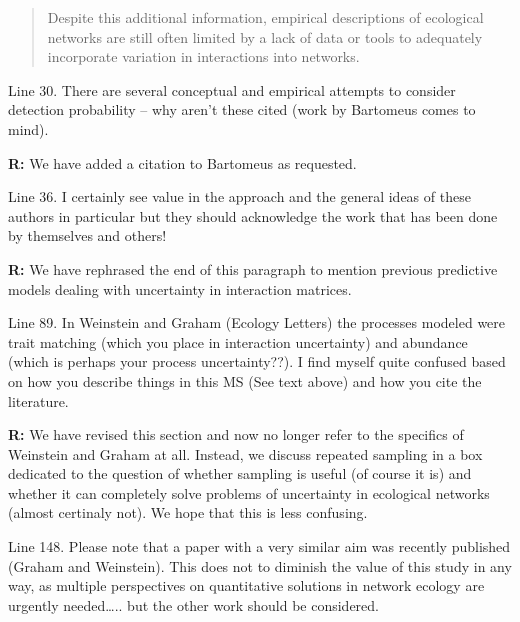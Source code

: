\documentclass[12pt]{letter}
\newenvironment{refquote}{\bigskip \begin{it}}{\end{it}\smallskip}
\begin{document}
			\begin{quotation}
				Despite this additional information, empirical descriptions of ecological networks are still often limited by a lack of data or tools to adequately incorporate variation in interactions into networks.
			\end{quotation}


		\begin{refquote}
		Line 30.  There are several conceptual and empirical attempts to consider detection probability – why aren’t these cited (work by Bartomeus comes to mind).\\
		\end{refquote}

			\textbf{R:} We have added a citation to Bartomeus as requested.

		\begin{refquote}
			Line 36.  I certainly see value in the approach and the general ideas of these authors in particular but they should acknowledge the work that has been done by themselves and others!\\
		\end{refquote}

		\textbf{R:} We have rephrased the end of this paragraph to mention previous predictive models dealing with uncertainty in interaction matrices.

		\begin{refquote}
		Line 89.  In Weinstein and Graham (Ecology Letters) the processes modeled were trait matching (which you place in interaction uncertainty) and abundance (which is perhaps your process uncertainty??).  I find myself quite confused based on how you describe things in this MS (See text above) and how you cite the literature.
		\end{refquote}

		\textbf{R:} We have revised this section and now no longer refer to the specifics of Weinstein and Graham at all. Instead, we discuss repeated sampling in a box dedicated to the question of whether sampling is useful (of course it is) and whether it can completely solve problems of uncertainty in ecological networks (almost certinaly not). We hope that this is less confusing.

		\begin{refquote}
		Line 148.  Please note that a paper with a very similar aim was recently published (Graham and Weinstein).  This does not to diminish the value of this study in any way, as multiple perspectives on quantitative solutions in network ecology are urgently needed….. but the other work should be considered. 
		\end{refquote}
\end{document}

